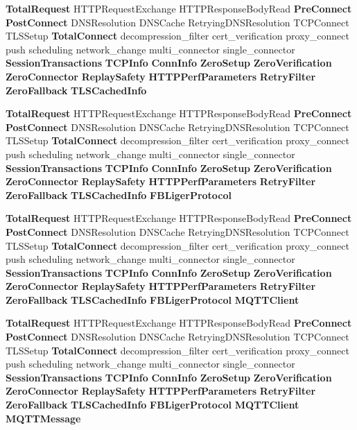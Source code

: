 \begin{DoxyCompactItemize}
\item 
{\bf Total\+Request} H\+T\+T\+P\+Request\+Exchange H\+T\+T\+P\+Response\+Body\+Read {\bf Pre\+Connect} {\bf Post\+Connect} D\+N\+S\+Resolution D\+N\+S\+Cache Retrying\+D\+N\+S\+Resolution T\+C\+P\+Connect T\+L\+S\+Setup {\bf Total\+Connect} decompression\+\_\+filter cert\+\_\+verification proxy\+\_\+connect push scheduling network\+\_\+change multi\+\_\+connector single\+\_\+connector {\bf Session\+Transactions} {\bf T\+C\+P\+Info} {\bf Conn\+Info} {\bf Zero\+Setup} {\bf Zero\+Verification} {\bf Zero\+Connector} {\bf Replay\+Safety} {\bf H\+T\+T\+P\+Perf\+Parameters} {\bf Retry\+Filter} {\bf Zero\+Fallback} {\bf T\+L\+S\+Cached\+Info}
\item 
{\bf Total\+Request} H\+T\+T\+P\+Request\+Exchange H\+T\+T\+P\+Response\+Body\+Read {\bf Pre\+Connect} {\bf Post\+Connect} D\+N\+S\+Resolution D\+N\+S\+Cache Retrying\+D\+N\+S\+Resolution T\+C\+P\+Connect T\+L\+S\+Setup {\bf Total\+Connect} decompression\+\_\+filter cert\+\_\+verification proxy\+\_\+connect push scheduling network\+\_\+change multi\+\_\+connector single\+\_\+connector {\bf Session\+Transactions} {\bf T\+C\+P\+Info} {\bf Conn\+Info} {\bf Zero\+Setup} {\bf Zero\+Verification} {\bf Zero\+Connector} {\bf Replay\+Safety} {\bf H\+T\+T\+P\+Perf\+Parameters} {\bf Retry\+Filter} {\bf Zero\+Fallback} {\bf T\+L\+S\+Cached\+Info} {\bf F\+B\+Liger\+Protocol}
\item 
{\bf Total\+Request} H\+T\+T\+P\+Request\+Exchange H\+T\+T\+P\+Response\+Body\+Read {\bf Pre\+Connect} {\bf Post\+Connect} D\+N\+S\+Resolution D\+N\+S\+Cache Retrying\+D\+N\+S\+Resolution T\+C\+P\+Connect T\+L\+S\+Setup {\bf Total\+Connect} decompression\+\_\+filter cert\+\_\+verification proxy\+\_\+connect push scheduling network\+\_\+change multi\+\_\+connector single\+\_\+connector {\bf Session\+Transactions} {\bf T\+C\+P\+Info} {\bf Conn\+Info} {\bf Zero\+Setup} {\bf Zero\+Verification} {\bf Zero\+Connector} {\bf Replay\+Safety} {\bf H\+T\+T\+P\+Perf\+Parameters} {\bf Retry\+Filter} {\bf Zero\+Fallback} {\bf T\+L\+S\+Cached\+Info} {\bf F\+B\+Liger\+Protocol} {\bf M\+Q\+T\+T\+Client}
\item 
{\bf Total\+Request} H\+T\+T\+P\+Request\+Exchange H\+T\+T\+P\+Response\+Body\+Read {\bf Pre\+Connect} {\bf Post\+Connect} D\+N\+S\+Resolution D\+N\+S\+Cache Retrying\+D\+N\+S\+Resolution T\+C\+P\+Connect T\+L\+S\+Setup {\bf Total\+Connect} decompression\+\_\+filter cert\+\_\+verification proxy\+\_\+connect push scheduling network\+\_\+change multi\+\_\+connector single\+\_\+connector {\bf Session\+Transactions} {\bf T\+C\+P\+Info} {\bf Conn\+Info} {\bf Zero\+Setup} {\bf Zero\+Verification} {\bf Zero\+Connector} {\bf Replay\+Safety} {\bf H\+T\+T\+P\+Perf\+Parameters} {\bf Retry\+Filter} {\bf Zero\+Fallback} {\bf T\+L\+S\+Cached\+Info} {\bf F\+B\+Liger\+Protocol} {\bf M\+Q\+T\+T\+Client} {\bf M\+Q\+T\+T\+Message}

\end{DoxyCompactItemize}
